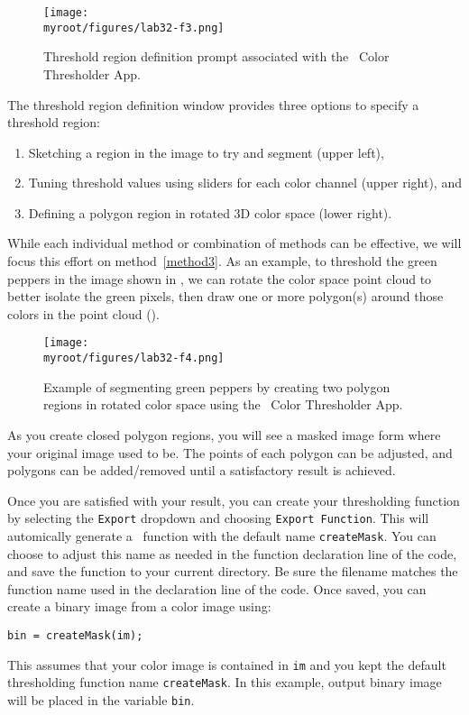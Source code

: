 \documentclass{tufte-handout}
\newcommand{\myroot}{../..}
\begin{document}
\begin{figure}
\begin{center}
\texttt{[image: \\myroot/figures/lab32-f3.png]}
\end{center}
\caption{Threshold region definition prompt associated with the \Matlab\ Color Thresholder App.}
\label{fig:3}
\end{figure}
The threshold region definition window provides three options to specify a threshold region:
\begin{enumerate}
\item Sketching a region in the image to try and segment (upper left), 
\item Tuning threshold values using sliders for each color channel (upper right), and 
\item\label{method3} Defining a polygon region in rotated 3D color space (lower right). 
\end{enumerate}
While each individual method or combination of methods can be effective, we will focus this effort on method~\ref{method3}. As an example, to threshold the green peppers in the image shown in , we can rotate the color space point cloud to better isolate the green pixels, then draw one or more polygon(s) around those colors in the point cloud (). 

\begin{figure}
\begin{center}
\texttt{[image: \\myroot/figures/lab32-f4.png]}
\end{center}
\caption{Example of segmenting green peppers by creating two polygon regions in rotated color space using the \Matlab\ Color Thresholder App.}
\label{fig:4}
\end{figure}
As you create closed polygon regions, you will see a masked image form where your original image used to be. The points of each polygon can be adjusted, and polygons can be added/removed until a satisfactory result is achieved. 

Once you are satisfied with your result, you can create your thresholding function by selecting the \lstinline{Export} dropdown and choosing \lstinline{Export Function}. This will automically generate a \Matlab\ function with the default name \lstinline{createMask}. You can choose to adjust this name as needed in the function declaration line of the code, and save the function to your current directory. Be sure the filename matches the function name used in the declaration line of the code. Once saved, you can create a binary image from a color image using:
\begin{lstlisting}[style=usnaMatlab]
bin = createMask(im);
\end{lstlisting}
This assumes that your color image is contained in \lstinline{im} and you kept the default thresholding function name \lstinline{createMask}. In this example, output binary image will be placed in the variable \lstinline{bin}.
\end{document}
